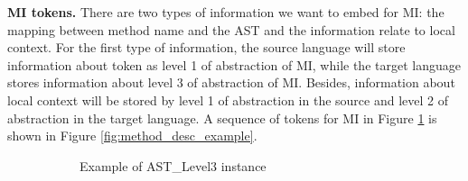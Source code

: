  \textbf{MI tokens.} There are two types of information we want to embed for MI: the mapping between method name and the AST and the information relate to local context. For the first type of information, the source language will store information about token as level 1 of abstraction of MI, while the target language stores information about level 3 of abstraction of MI. Besides, information about local context will be stored by level 1 of abstraction in the source and level 2 of abstraction in the target language. A sequence of tokens for MI in Figure \ref{fig:mapping_expression} is shown in Figure \ref{fig:method_desc_example}.
 \noindent
\begin{figure}
    \centering
      \begin{subfigure}{0.3\textwidth}
        \caption{Example of AST\_Level3 instance}
        \label{fig:mapping_expression} 
      \end{subfigure}
      \hfill
      \begin{subfigure}[t]{0.23\textwidth}
\end{subfigure}
\end{figure}

